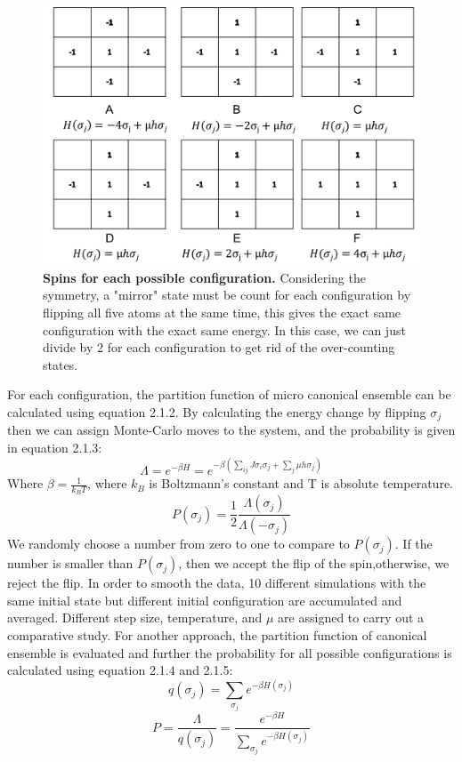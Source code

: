 \documentclass{llncs}
\begin{document}
\begin{figure}
	\includegraphics[width=\linewidth]{images/spins.png}
	\caption{\textbf{Spins for each possible configuration.} Considering the symmetry, a "mirror" state must be count for each configuration by flipping all five atoms at the same time, this gives the exact same configuration with the exact same energy. In this case, we can just divide by 2 for each configuration to get rid of the over-counting states.}
	\label{fig:spins}
\end{figure}
For each configuration, the partition function of micro canonical ensemble can be calculated using equation 2.1.2. By calculating the energy change by flipping $\sigma_j$ then we can assign Monte-Carlo moves to the system, and the probability is given in equation 2.1.3:
\begin{equation} 
\Lambda=e^{-\beta H} = e^{-\beta (\sum_{ij}  J\sigma_i\sigma_j+\sum_j\mu h\sigma_j) }
\end{equation}
Where $\beta=\frac{1}{k_BT}$, where $k_B$ is Boltzmann's constant and T is absolute temperature.
\begin{equation} 
P(\sigma_j)=\frac{1}{2} \frac{\Lambda(\sigma_j)}{\Lambda(-\sigma_j)}
\end{equation}
We randomly choose a number from zero to one to compare to $P(\sigma_j)$. If the number is smaller than $P(\sigma_j)$, then we accept the flip of the spin,otherwise, we reject the flip. In order to smooth the data, 10 different simulations with the same initial state but different initial configuration are accumulated and averaged. Different step size, temperature, and $\mu$ are assigned to carry out a comparative study.
For another approach,  the partition function of canonical ensemble is evaluated and further the probability for all possible configurations is calculated using equation 2.1.4 and 2.1.5:
\begin{equation} 
q(\sigma_j)=\sum_{\sigma_j} e^{-\beta H(\sigma_j)}
\end{equation}
\begin{equation} 
P=\frac{\Lambda}{q(\sigma_j)}=\frac{e^{-\beta H}}{\sum_{\sigma_j} e^{-\beta H(\sigma_j)}}
\end{equation}
\end{document}
